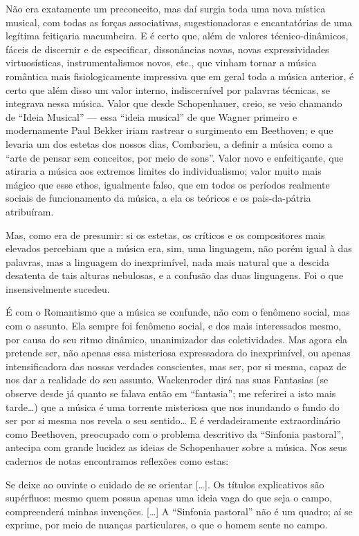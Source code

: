 Não era exatamente um preconceito, mas daí surgia toda uma nova mística
musical, com todas as forças associativas, sugestionadoras e
encantatórias de uma legítima feitiçaria macumbeira. E é certo que, além
de valores técnico-dinâmicos, fáceis de discernir e de especificar,
dissonâncias novas, novas expressividades virtuosísticas,
instrumentalismos novos, etc., que vinham tornar a música romântica mais
fisiologicamente impressiva que em geral toda a música anterior, é certo
que além disso um valor interno, indiscernível por palavras técnicas, se
integrava nessa música. Valor que desde Schopenhauer, creio, se veio
chamando de ``Ideia Musical'' --- essa ``ideia musical'' de que Wagner
primeiro e modernamente Paul Bekker iriam rastrear o surgimento em
Beethoven; e que levaria um dos estetas dos nossos dias, Combarieu, a
definir a música como a ``arte de pensar sem conceitos, por meio de
sons''. Valor novo e enfeitiçante, que atiraria a música aos extremos
limites do individualismo; valor muito mais mágico que esse ethos,
igualmente falso, que em todos os períodos realmente sociais de
funcionamento da música, a ela os teóricos e os pais-da-pátria
atribuíram.

Mas, como era de presumir: si os estetas, os críticos e os compositores
mais elevados percebiam que a música era, sim, uma linguagem, não porém
igual à das palavras, mas a linguagem do inexprimível, nada mais natural
que a descida desatenta de tais alturas nebulosas, e a confusão das duas
linguagens. Foi o que insensivelmente sucedeu.

É com o Romantismo que a música se confunde, não com o fenômeno social,
mas com o assunto. Ela sempre foi fenômeno social, e dos mais
interessados mesmo, por causa do seu ritmo dinâmico, unanimizador das
coletividades. Mas agora ela pretende ser, não apenas essa misteriosa
expressadora do inexprimível, ou apenas intensificadora das nossas
verdades conscientes, mas ser, por si mesma, capaz de nos dar a
realidade do seu assunto. Wackenroder dirá nas suas Fantasias (se
observe desde já quanto se falava então em ``fantasia''; me referirei a
isto mais tarde\ldots{}) que a música é uma torrente misteriosa que nos
inundando o fundo do ser por si mesma nos revela o seu sentido\ldots{} E é
verdadeiramente extraordinário como Beethoven, preocupado com o problema
descritivo da ``Sinfonia pastoral'', antecipa com grande lucidez as
ideias de Schopenhauer sobre a música. Nos seus cadernos de notas
encontramos reflexões como estas:

Se deixe ao ouvinte o cuidado de se orientar {[}\ldots{}{]}. Os títulos
explicativos são supérfluos: mesmo quem possua apenas uma ideia vaga do
que seja o campo, compreenderá minhas invenções. {[}\ldots{}{]} A ``Sinfonia
pastoral'' não é um quadro; aí se exprime, por meio de nuanças
particulares, o que o homem sente no campo.

